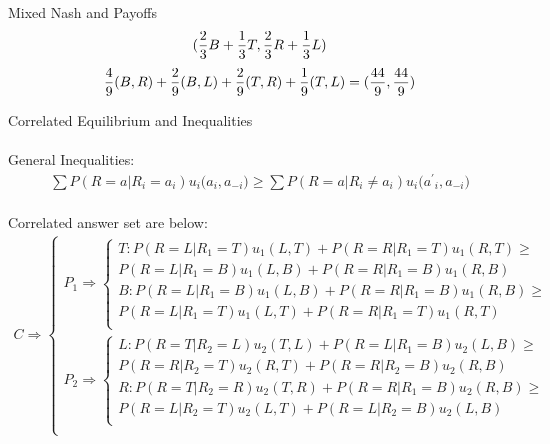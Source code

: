 \documentclass[
  course = {{IE579 Game Theory and Multi-Agent Reinforcement Learning}},
  assignment = 1,
  name = {{Mohammad Mahdi Rahimi}},
  studentnumber = {{20208244}},
  email = {{mahi@kaist.ac.kr}},
  firstexercise = 1
]{aga-homework}
\begin{document}
\subexercise Mixed Nash and Payoffs
\begin{equation} \label{eq1}
\begin{split}
({2 \over 3}B + {1 \over 3} T, {2 \over 3}R + {1 \over 3}L)
\end{split}
\end{equation}
\begin{equation} \label{eq1}
\begin{split}
{4 \over 9}(B,R) + {2 \over 9}(B, L) + {2 \over 9}(T, R) + {1 \over 9}(T, L) = ({44 \over 9}, {44 \over 9})
\end{split}
\end{equation}

\subexercise Correlated Equilibrium and Inequalities
\\\\
General Inequalities:\\ 
\begin{equation} \label{eq1}
\begin{split}
\sum{P(R = a | R_i  = a_i) u_i(a_i, a_{-i}}) \ge \sum{P(R = a | R_i  \neq a_i) u_i({a^\prime}_i, a_{-i}})
\end{split}
\end{equation}
\\
Correlated answer set are below:\\ 
\begin{equation}
    \begin{split}
    C \Rightarrow \begin{cases}
    P_1 \Rightarrow 
     \begin{cases}
            T: P(R = L | R_1  = T) u_1(L, T) + P(R = R | R_1  = T) u_1(R, T) \ge\\
            P(R = L | R_1 = B) u_1(L, B) + P(R = R | R_1  = B) u_1(R, B)\\
            B: P(R = L | R_1  = B) u_1(L, B) + P(R = R | R_1  = B) u_1(R, B) \ge\\
            P(R = L | R_1 = T) u_1(L, T) + P(R = R | R_1  = T) u_1(R, T)\\
     \end{cases}\\
    P_2 \Rightarrow 
     \begin{cases}
            L: P(R = T | R_2  = L) u_2(T, L) + P(R = L | R_1  = B) u_2(L, B) \ge\\
            P(R = R | R_2 = T) u_2(R, T) + P(R = R | R_2  = B) u_2(R, B)\\
            R: P(R = T | R_2  = R) u_2(T, R) + P(R = R | R_1  = B) u_2(R, B) \ge\\
            P(R = L | R_2 = T) u_2(L, T) + P(R = L | R_2  = B) u_2(L, B)\\
     \end{cases}\\
    \end{cases}
    \end{split}
\end{equation}
\end{document}
